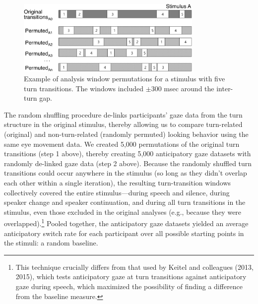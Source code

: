 \documentclass[authoryear, 12pt]{elsarticle}
\begin{document}
\begin{figure}[t!]
\begin{center}
\includegraphics[width=0.8\textwidth]{figures/FIG-ShuffledWindows.png}
\end{center}
\caption{Example of analysis window permutations for a stimulus with five turn transitions. The windows included $\pm$300 msec around the inter-turn gap.} 
\label{fig:shuffling}
\end{figure}

The random shuffling procedure de-links participants' gaze data from the turn structure in the original stimulus, thereby allowing us to compare turn-related (original) and non-turn-related (randomly permuted) looking behavior using the same eye movement data. We created 5,000 permutations of the original turn transitions (step 1 above), thereby creating 5,000 anticipatory gaze datasets with randomly de-linked gaze data (step 2 above). Because the randomly shuffled turn transitions could occur anywhere in the stimulus (so long as they didn't overlap each other within a single iteration), the resulting turn-transition windows collectively covered the entire stimulus---during speech and silence, during speaker change and speaker continuation, and during all turn transitions in the stimulus, even those excluded in the original analyses (e.g., because they were overlapped).\footnote{This technique crucially differs from that used by Keitel and colleagues (2013, 2015), which tests anticipatory gaze at turn transitions against anticipatory gaze during speech, which maximized the possibility of finding a difference from the baseline measure.} Pooled together, the anticipatory gaze datasets yielded an average anticipatory switch rate for each participant over all possible starting points in the stimuli: a random baseline.
\end{document}
